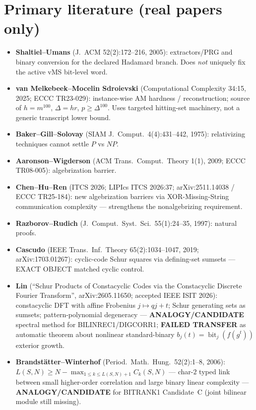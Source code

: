\documentclass[11pt]{article}
\begin{document}
\section*{Primary literature (real papers only)}
\begin{itemize}
\item \textbf{Shaltiel--Umans} (J.~ACM 52(2):172--216, 2005): extractors/PRG and binary
conversion for the declared Hadamard branch. Does \emph{not} uniquely fix the active
vMS bit-level word.
\item \textbf{van Melkebeek--Mocelin Sdroievski} (Computational Complexity 34:15, 2025;
ECCC TR23-029): instance-wise AM hardness / reconstruction; source of $h=m^{100}$,
$\Delta=hr$, $p\ge\Delta^{100}$. Uses targeted hitting-set machinery, not a generic
transcript lower bound.
\item \textbf{Baker--Gill--Solovay} (SIAM J.\ Comput.\ 4(4):431--442, 1975): relativizing
techniques cannot settle $P$ vs $NP$.
\item \textbf{Aaronson--Wigderson} (ACM Trans.\ Comput.\ Theory 1(1), 2009; ECCC TR08-005):
algebrization barrier.
\item \textbf{Chen--Hu--Ren} (ITCS 2026; LIPIcs ITCS 2026:37; arXiv:2511.14038 / ECCC TR25-184):
new algebrization barriers via XOR-Missing-String communication complexity ---
strengthens the nonalgebrizing requirement.
\item \textbf{Razborov--Rudich} (J.\ Comput.\ Syst.\ Sci.\ 55(1):24--35, 1997): natural proofs.
\item \textbf{Cascudo} (IEEE Trans.\ Inf.\ Theory 65(2):1034--1047, 2019; arXiv:1703.01267):
cyclic-code Schur squares via defining-set sumsets --- EXACT OBJECT matched cyclic control.
\item \textbf{Lin} (``Schur Products of Constacyclic Codes via the Constacyclic Discrete
Fourier Transform'', arXiv:2605.11650; accepted IEEE ISIT 2026): constacyclic DFT with
affine Frobenius $j\mapsto qj+t$; Schur generating sets as sumsets; pattern-polynomial
degeneracy --- \textbf{ANALOGY/CANDIDATE} spectral method for BILINREC1/DIGCORR1;
\textbf{FAILED TRANSFER} as automatic theorem about nonlinear standard-binary
$b_j(t)=\operatorname{bit}_j(f(g^t))$ exterior growth.
\item \textbf{Brandst\"atter--Winterhof} (Period.\ Math.\ Hung.\ 52(2):1--8, 2006):
$L(S,N)\ge N-\max_{1\le k\le L(S,N)+1}C_k(S,N)$ --- char-$2$ typed link between small
higher-order correlation and large binary linear complexity ---
\textbf{ANALOGY/CANDIDATE} for BITRANK1 Candidate~C (joint bilinear module still missing).

\end{itemize}
\end{document}
